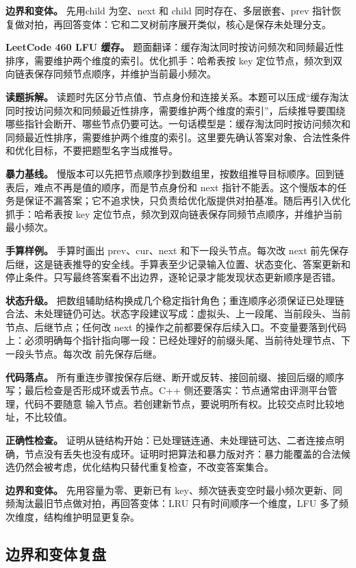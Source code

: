 \textbf{边界和变体。} 先用child 为空、next 和 child 同时存在、多层嵌套、prev 指针恢复做对拍，再回答变体：它和二叉树前序展开类似，核心是保存未处理分支。

\noindent\textbf{LeetCode 460 LFU 缓存。} 题面翻译：缓存淘汰同时按访问频次和同频最近性排序，需要维护两个维度的索引。优化抓手：哈希表按 key 定位节点，频次到双向链表保存同频节点顺序，并维护当前最小频次。

\textbf{读题拆解。} 读题时先区分节点值、节点身份和连接关系。本题可以压成“缓存淘汰同时按访问频次和同频最近性排序，需要维护两个维度的索引”，后续推导要围绕哪些指针会断开、哪些节点仍要可达。一句话模型是：缓存淘汰同时按访问频次和同频最近性排序，需要维护两个维度的索引。这里要先确认答案对象、合法性条件和优化目标，不要把题型名字当成推导。

\textbf{暴力基线。} 慢版本可以先把节点顺序抄到数组里，按数组推导目标顺序。回到链表后，难点不再是值的顺序，而是节点身份和 next 指针不能丢。这个慢版本的任务是保证不漏答案；它不追求快，只负责给优化版提供对拍基准。随后再引入优化抓手：哈希表按 key 定位节点，频次到双向链表保存同频节点顺序，并维护当前最小频次。

\textbf{手算样例。} 手算时画出 prev、cur、next 和下一段头节点。每次改 next 前先保存后继，这是链表推导的安全线。手算表至少记录输入位置、状态变化、答案更新和停止条件。只写最终答案看不出边界，逐轮记录才能发现状态更新顺序是否错。

\textbf{状态升级。} 把数组辅助结构换成几个稳定指针角色；重连顺序必须保证已处理链合法、未处理链仍可达。状态字段建议写成：虚拟头、上一段尾、当前段头、当前节点、后继节点；任何改 next 的操作之前都要保存后续入口。不变量要落到代码上：必须明确每个指针指向哪一段：已经处理好的前缀头尾、当前待处理节点、下一段头节点。每次改  前先保存后继。

\textbf{代码落点。} 所有重连步骤按保存后继、断开或反转、接回前缀、接回后缀的顺序写；最后检查是否形成环或丢节点。C++ 侧还要落实：节点通常由评测平台管理，代码不要随意  输入节点。若创建新节点，要说明所有权。比较交点时比较地址，不比较值。

\textbf{正确性检查。} 证明从链结构开始：已处理链连通、未处理链可达、二者连接点明确，节点没有丢失也没有成环。证明时把算法和暴力版对齐：暴力能覆盖的合法候选仍然会被考虑，优化结构只替代重复检查，不改变答案集合。

\textbf{边界和变体。} 先用容量为零、更新已有 key、频次链表变空时最小频次更新、同频淘汰最旧节点做对拍，再回答变体：LRU 只有时间顺序一个维度，LFU 多了频次维度，结构维护明显更复杂。

\subsection{边界和变体复盘}


